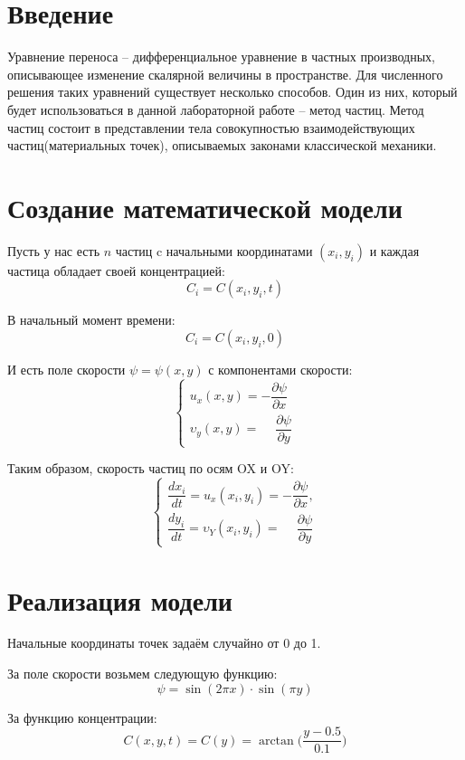 \documentclass[a4paper, 14pt]{extarticle}
\begin{document}
	\pagebreak	

	\section{Введение}
		Уравнение переноса -- дифференциальное уравнение в частных производных, описывающее изменение скалярной величины в пространстве. Для численного решения таких уравнений существует несколько способов. Один из них, который будет использоваться в данной лабораторной работе -- метод частиц. Метод частиц состоит в представлении тела совокупностью взаимодействующих частиц(материальных точек), описываемых законами классической механики.
		
	\section{Создание математической модели}
		Пусть у нас есть $n$ частиц c начальными координатами $(x_i, y_i)$ и каждая частица обладает своей концентрацией:
		\[ C_i = C(x_i, y_i, t)\]
		
		В начальный момент времени: 
		\[ C_i = C(x_i, y_i, 0) \]
		
		И есть поле скорости $\psi = \psi(x, y)$ с компонентами скорости:
		\[ \begin{cases}
			u_x (x, y) = -\dfrac{\partial \psi}{\partial x} \\[7pt]
			\upsilon_y (x, y) = \phantom{-} \dfrac{\partial \psi}{\partial y}
		\end{cases} \]
		
		Таким образом, скорость частиц по осям OX и OY:
		\[ \begin{cases}
				\dfrac{dx_i}{dt} = u_x(x_i, y_i) = -\dfrac{\partial \psi}{\partial x}, \\[7pt]
				\dfrac{dy_i}{dt} =\upsilon_Y (x_i, y_i) = \phantom{-}\dfrac{\partial \psi}{\partial y}
			\end{cases}
		\]

	\section{Реализация модели}
		Начальные координаты точек задаём случайно от 0 до 1.
		
		За поле скорости возьмем следующую функцию:
		\[ \psi = \sin(2\pi x) \cdot \sin(\pi y) \]
		
		За функцию концентрации:
		\[ C(x, y, t) = C(y) = \arctan{\Bigg(\dfrac{y-0.5}{0.1}\Bigg)} \]
			
\end{document}

